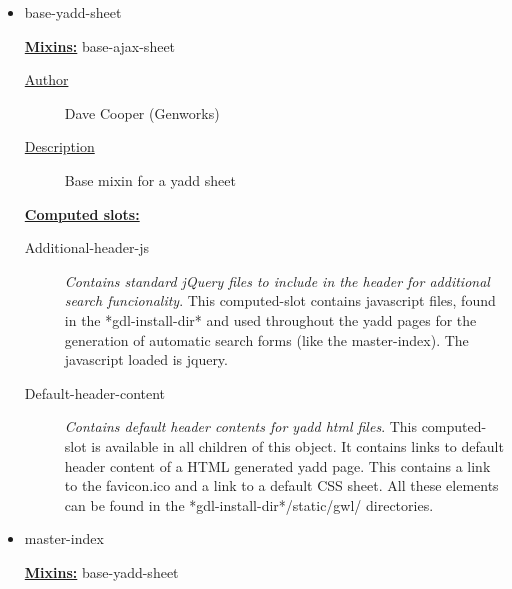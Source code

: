 \documentclass [11pt]{book}
\begin{document}
\begin{itemize}
\item {}base-yadd-sheet


\textbf{
\underline{Mixins:}} base-ajax-sheet





\begin{description}

\item [
\underline{Author}]


Dave Cooper (Genworks)



\item [
\underline{Description}]


Base mixin for a yadd sheet



\end{description}








\textbf{
\underline{Computed slots:}}

\begin{description}

\item [Additional-header-js]
\emph{Contains standard jQuery files to include in the header for additional search funcionality}.
This computed-slot contains javascript files, found in the *gdl-install-dir*
and used throughout the yadd pages for the generation of automatic search forms (like the master-index).
The javascript loaded is jquery.


\item [Default-header-content]
\emph{Contains default header contents for yadd html files}.
This computed-slot is available in all children of this object. It contains links
to default header content of a HTML generated yadd page. This contains a
link to the favicon.ico and a link to a default CSS sheet. All these elements can be
found in the *gdl-install-dir*/static/gwl/ directories.


\end{description}







\item {}master-index


\textbf{
\underline{Mixins:}} base-yadd-sheet






\end{itemize}
\end{document}
